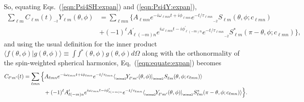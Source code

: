 \documentclass[11pt]{article}
\newcommand{\braket}[2]{\langle #1|#2\rangle}
\newcommand{\swY}[4][]{{}_{{}_{#2}}\!Y^{#1}_{#3}(#4)}
\newcommand{\swSH}[5][]{{}_{{}_{#2}}S^{#1}_{#3}(#4;#5)}
\begin{document}
So, equating Eqs.~(\ref{eqn:Psi4SH:expan}) and (\ref{eqn:Psi4Y:expan}), 
\begin{equation} \label{eqn:equate:expan}
\begin{aligned}
\sum_{\ell{m}} C_{\ell{m}}(t) \swY{\minus 2}{\ell{m}}{\theta,\phi} & = \sum_{\ell{m}n} \Big\{ A_{\ell{m}n} e^{-i\omega_{\ell{m}n}t+i\phi_{\ell{m}n}}e^{-t/\tau_{\ell{m}n}} \swSH{\minus 2}{\ell{m}}{\theta,\phi}{c_{\ell{m}n}}\\
& + (-1)^\ell A^\prime_{\ell(-m)n} e^{i\omega_{\ell{m}n}t-i\phi^\prime_{\ell(-m)n}}e^{-t/\tau_{\ell{m}n}} \swSH[*]{\minus 2}{\ell{m}}{\pi-\theta,\phi}{c_{\ell{m}n}} \Big\},
\end{aligned}
\end{equation}
and using the usual definition for the inner product $\braket{f(\theta, \phi)}{g(\theta, \phi)} \equiv \int{f^{*}(\theta, \phi) g(\theta, \phi) d\Omega}$ along with the orthonormality of the spin-weighted spherical harmonics, Eq,~(\ref{eqn:equate:expan}) becomes
\begin{equation} \label{clm:eq2}
\begin{aligned}
C_{\ell^\prime{m^\prime}}(t) &= \sum_{\ell{m}n} \Big\{ 
   A_{\ell{m}n} e^{-i\omega_{\ell{m}n}t+i\phi_{\ell{m}n}}e^{-t/\tau_{\ell{m}n}} 
   \braket{\swY{\minus 2}{\ell^\prime{m^\prime}}{\theta,\phi}}{\swSH{\minus 2}{\ell{m}}{\theta,\phi}{c_{\ell{m}n}}} \\
& {}\hspace{0.5in} 
  +  (-1)^\ell A^\prime_{\ell(-m)n} e^{i\omega_{\ell{m}n}t-i\phi^\prime_{\ell(-m)n}}e^{-t/\tau_{\ell{m}n}} 
   \braket{\swY{\minus 2}{\ell^\prime{m^\prime}}{\theta,\phi}}{\swSH[*]{\minus 2}{\ell{m}}{\pi-\theta,\phi}{c_{\ell{m}n}}} \Big\}.
\end{aligned}
\end{equation}
\end{document}

